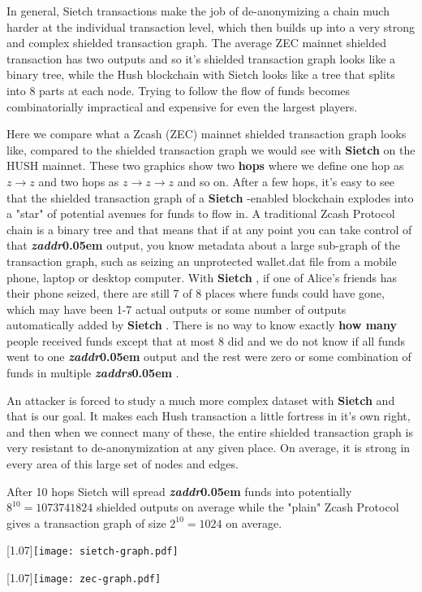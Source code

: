\documentclass{article}
\let\oldtexttt\texttt
\renewcommand{\texttt}[1]{\scalebox{1.02}[1.07]{\oldtexttt{#1}}}
\newcommand{\term}[1]{\textsl{#1}\kern 0.05em\xspace}
\newcommand{\zaddr}{\textbf{\term{zaddr} }}
\newcommand{\zaddrs}{\textbf{\term{zaddrs} }}
\newcommand{\Sietch}{\textbf{Sietch} }
\begin{document}
In general, Sietch transactions make the job of de-anonymizing a chain much harder at the individual
transaction level, which then builds up into a very strong and complex shielded transaction graph.
The average ZEC mainnet shielded transaction has two outputs and so it's shielded transaction graph
looks like a binary tree, while the Hush blockchain with Sietch looks like a tree that splits into
8 parts at each node. Trying to follow the flow of funds becomes combinatorially impractical and
expensive for even the largest players.

Here we compare what a Zcash (ZEC) mainnet shielded transaction graph looks like, compared to
the shielded transaction graph we would see with \Sietch on the HUSH mainnet. These two graphics
show two \textbf{hops} where we define one hop as $ z \rightarrow z $ and two hops as
$ z \rightarrow z \rightarrow z $ and so on. After a few hops, it's easy to see that the shielded
transaction graph of a \Sietch-enabled blockchain explodes into a "star" of potential avenues for
funds to flow in. A traditional Zcash Protocol chain is a binary tree and that means that if at
any point you can take control of that \zaddr output, you know metadata about a large sub-graph
of the transaction graph, such as seizing an unprotected wallet.dat file from a mobile phone,
laptop or desktop computer. With \Sietch, if one of Alice's friends has their phone seized, there
are still 7 of 8 places where funds could have gone, which may have been 1-7 actual outputs or
some number of outputs automatically added by \Sietch. There is no way to know exactly \textbf{how many}
people received funds except that at most 8 did and we do not know if all funds went to one \zaddr
output and the rest were zero or some combination of funds in multiple \zaddrs .

An attacker is forced to study a much more complex dataset with \Sietch and that is our goal. It
makes each Hush transaction a little fortress in it's own right, and then when we connect many
of these, the entire shielded transaction graph is very resistant to de-anonymization at any given
place. On average, it is strong in every area of this large set of nodes and edges.

After 10 hops Sietch will spread \zaddr funds into potentially $ 8^{10} = 1073741824 $ shielded outputs
on average while the "plain" Zcash Protocol gives a transaction graph of size  $ 2^{10} =  1024  $ on
average.

\begin{center}
\texttt{[image: sietch-graph.pdf]}

\texttt{[image: zec-graph.pdf]}
\end{center}
\end{document}
